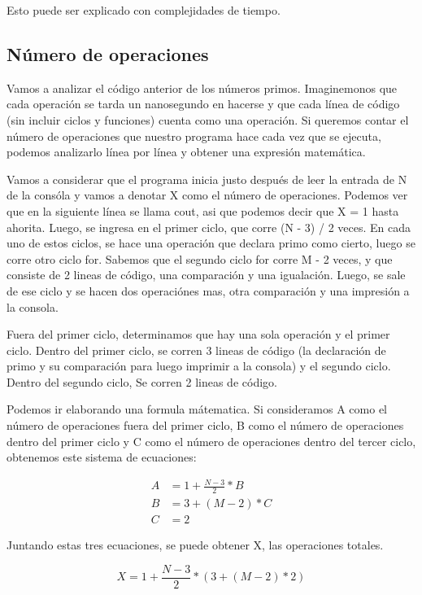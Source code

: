 \documentclass{article}
\begin{document}
Esto puede ser explicado con complejidades de tiempo.

\subsection{Número de operaciones}

Vamos a analizar el código anterior de los números primos. Imaginemonos que cada operación se tarda un nanosegundo en hacerse y que cada línea de código (sin incluir ciclos y funciones) cuenta como una operación. Si queremos contar el número de operaciones que nuestro programa hace cada vez que se ejecuta, podemos analizarlo línea por línea y obtener una expresión matemática.

Vamos a considerar que el programa inicia justo después de leer la entrada de N de la consóla y vamos a denotar X como el número de operaciones. Podemos ver que en la siguiente línea se llama cout, asi que podemos decir que X = 1 hasta ahorita. Luego, se ingresa en el primer ciclo, que corre (N - 3) / 2 veces. En cada uno de estos ciclos, se hace una operación que declara primo como cierto, luego se corre otro ciclo for. Sabemos que el segundo ciclo for corre M - 2 veces, y que consiste de 2 lineas de código, una comparación y una igualación. Luego, se sale de ese ciclo y se hacen dos operaciónes mas, otra comparación y una impresión a la consola.

Fuera del primer ciclo, determinamos que hay una sola operación y el primer ciclo.
Dentro del primer ciclo, se corren 3 lineas de código (la declaración de primo y su comparación para luego imprimir a la consola) y el segundo ciclo.
Dentro del segundo ciclo, Se corren 2 lineas de código.

Podemos ir elaborando una formula mátematica. Si consideramos A como el número de operaciones fuera del primer ciclo, B como el número de operaciones dentro del primer ciclo y C como el número de operaciones dentro del tercer ciclo, obtenemos este sistema de ecuaciones:

\begin{align}
    A &= 1 + \frac{N - 3}{2} * B \\
    B &= 3 + (M - 2) * C \\
    C &= 2
\end{align}

Juntando estas tres ecuaciones, se puede obtener X, las operaciones totales.

\begin{equation}
    X = 1 + \frac{N - 3}{2} * (3 + (M - 2) * 2)
\end{equation}
\end{document}
